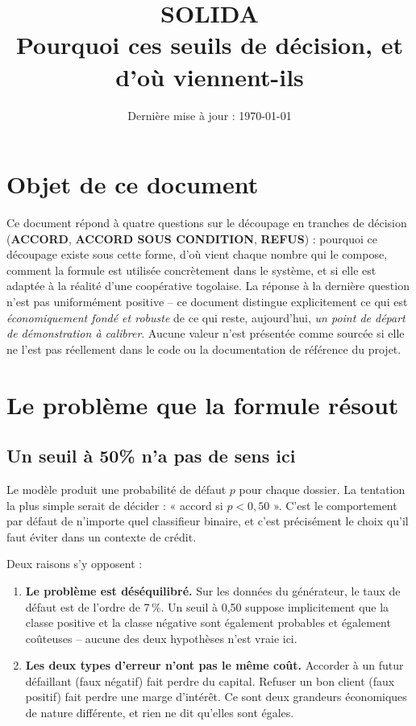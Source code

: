 \documentclass[11pt,a4paper]{article}
\title{\textcolor{solidateal}{\Huge SOLIDA} \\[0.3em] \Large Pourquoi ces seuils de décision, et d'où viennent-ils}
\author{}
\date{Dernière mise à jour : \today}
\newcommand{\tranche}[2]{\textcolor{#1}{\textbf{#2}}}
\begin{document}
\maketitle

\section*{Objet de ce document}

Ce document répond à quatre questions sur le découpage en tranches de décision
(\tranche{vertaccord}{ACCORD}, \tranche{orangevigilance}{ACCORD SOUS CONDITION},
\tranche{rougerefus}{REFUS}) : pourquoi ce découpage existe sous cette forme, d'où vient chaque
nombre qui le compose, comment la formule est utilisée concrètement dans le système, et si elle
est adaptée à la réalité d'une coopérative togolaise.
La réponse à la dernière question n'est pas uniformément positive -- ce document distingue
explicitement ce qui est \emph{économiquement fondé et robuste} de ce qui reste, aujourd'hui,
\emph{un point de départ de démonstration à calibrer}. Aucune valeur n'est présentée comme sourcée
si elle ne l'est pas réellement dans le code ou la documentation de référence du projet.

\tableofcontents

\section{Le problème que la formule résout}

\subsection{Un seuil à 50\% n'a pas de sens ici}

Le modèle produit une probabilité de défaut $p$ pour chaque dossier. La tentation la plus simple
serait de décider : « accord si $p < 0{,}50$ ». C'est le comportement par défaut de n'importe quel
classifieur binaire, et c'est précisément le choix qu'il faut éviter dans un contexte de crédit.

Deux raisons s'y opposent :

\begin{enumerate}
\item \textbf{Le problème est déséquilibré.} Sur les données du générateur, le taux de défaut est
de l'ordre de 7\,\%. Un seuil à 0,50 suppose implicitement que la classe positive et la classe
négative sont également probables et également coûteuses -- aucune des deux hypothèses n'est
vraie ici.
\item \textbf{Les deux types d'erreur n'ont pas le même coût.} Accorder à un futur défaillant
(faux négatif) fait perdre du capital. Refuser un bon client (faux positif) fait perdre une marge
d'intérêt. Ce sont deux grandeurs économiques de nature différente, et rien ne dit qu'elles sont
égales.
\end{enumerate}
\end{document}
